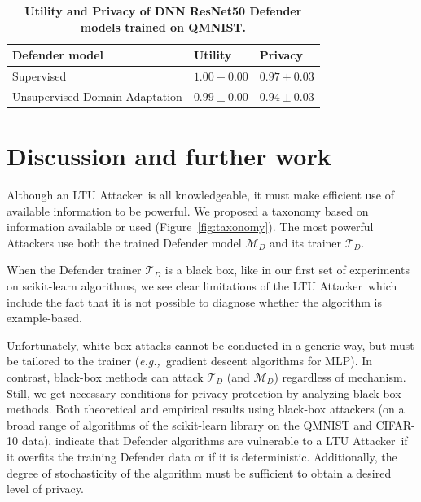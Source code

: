 \documentclass[letterpaper]{article}
\newcommand{\eg}{{\em e.g.,~}}
\newcommand{\oracle}{LTU Attacker~}
\begin{document}

\begin{table}[h]

\caption{\label{tab:DA} \footnotesize \bf Utility and Privacy of DNN ResNet50 Defender models trained on QMNIST.}
\vspace{1mm}
\centering
\setlength{\tabcolsep}{0.5mm}{} 
\begin{tabular}{|l|l|l|}
\hline
\cline{1-3}
Defender model  & Utility & Privacy \\
\hline
Supervised & \(1.00\pm 0.00\) & \(0.97\pm 0.03\) \\
\hline
Unsupervised Domain Adaptation  & \( 0.99\pm 0.00\) & \( 0.94\pm 0.03\) \\
\hline
\end{tabular}

\vspace{-0.5cm}
\end{table}


\section{Discussion and further work}
\label{sec:discussion}

Although an \oracle is all knowledgeable, it must make efficient use of available information to be powerful. We proposed a taxonomy 
based on information available or used (Figure~\ref{fig:taxonomy}). The most powerful Attackers use both the trained Defender model $\mathcal{M}_D$ and its trainer $\mathcal{T}_D$. 

When the Defender trainer $\mathcal{T}_D$ is a black box, like in our first set of experiments on scikit-learn algorithms, we see clear limitations of the \oracle which include the fact that it is not possible to diagnose whether the algorithm is example-based.

Unfortunately, white-box attacks cannot be conducted in a generic way, but must be tailored to the trainer (\eg  gradient descent algorithms for MLP). In contrast, black-box methods can attack $\mathcal{T}_D$ (and $\mathcal{M}_D$) regardless of mechanism. Still, we get necessary conditions for privacy protection by analyzing black-box methods. Both theoretical and empirical results using black-box attackers (on a broad range of algorithms of the scikit-learn library on the QMNIST and CIFAR-10 data),
indicate that Defender algorithms are vulnerable to a \oracle if it overfits the training Defender data or if it is deterministic. Additionally, the degree of stochasticity of the algorithm must be sufficient to obtain a desired level of privacy.
\end{document}
